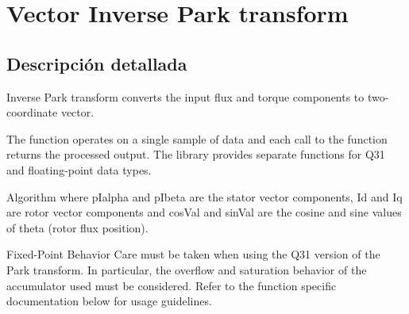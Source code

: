 \hypertarget{group__inv__park}{}\section{Vector Inverse Park transform}
\label{group__inv__park}


\subsection{Descripción detallada}
Inverse Park transform converts the input flux and torque components to two-\/coordinate vector.

The function operates on a single sample of data and each call to the function returns the processed output. The library provides separate functions for Q31 and floating-\/point data types. \begin{DoxyParagraph}{Algorithm}
 where {\ttfamily p\+Ialpha} and {\ttfamily p\+Ibeta} are the stator vector components, {\ttfamily Id} and {\ttfamily Iq} are rotor vector components and {\ttfamily cos\+Val} and {\ttfamily sin\+Val} are the cosine and sine values of theta (rotor flux position). 
\end{DoxyParagraph}
\begin{DoxyParagraph}{Fixed-\/\+Point Behavior}
Care must be taken when using the Q31 version of the Park transform. In particular, the overflow and saturation behavior of the accumulator used must be considered. Refer to the function specific documentation below for usage guidelines. 
\end{DoxyParagraph}
